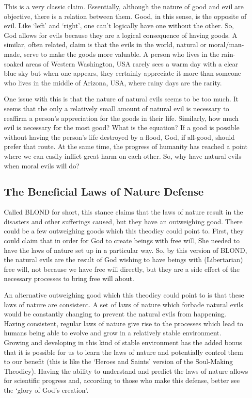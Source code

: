 This is a very classic claim. Essentially, although the nature of good and evil are objective, there is a relation between them. Good, in this sense, is the opposite of evil. Like ‘left’ and ‘right’, one can’t logically have one without the other. So, God allows for evils because they are a logical consequence of having goods. A similar, often related, claim is that the evils in the world, natural or moral/man-made, serve to make the goods more valuable. A person who lives in the rain-soaked areas of Western Washington, USA rarely sees a warm day with a clear blue sky but when one appears, they certainly appreciate it more than someone who lives in the middle of Arizona, USA, where rainy days are the rarity.  

One issue with this is that the nature of natural evils seems to be too much. It seems that the only a relatively small amount of natural evil is necessary to reaffirm a person's appreciation for the goods in their life. Similarly, how much evil is necessary for the most good? What is the equation? If a good is possible without having the person's life destroyed by a flood, God, if all-good, should prefer that route. At the same time, the progress of humanity has reached a point where we can easily inflict great harm on each other. So, why have natural evils when moral evils will do?

\subsection{The Beneficial Laws of Nature Defense}

Called BLOND for short, this stance claims that the laws of nature result in the disasters and other sufferings caused, but they have an outweighing good. There could be a few outweighing goods which this theodicy could point to. First, they could claim that in order for God to create beings with free will, She needed to have the laws of nature set up in a particular way. So, by this version of BLOND, the natural evils are the result of God wishing to have beings with (Libertarian) free will, not because we have free will directly, but they are a side effect of the necessary processes to bring free will about. 

An alternative outweighing good which  this theodicy could point to is that these laws of nature are consistent. A set of laws of nature which forbade natural evils would be constantly changing to prevent the natural evils from happening. Having consistent, regular laws of nature give rise to the processes which lead to humans being able to evolve and grow in a relatively stable environment. Growing and developing in this kind of stable environment has the added bonus that it is possible for us to learn the laws of nature and potentially control them to our benefit (this is like the `Heroes and Saints' version of the Soul-Making Theodicy). Having the ability to understand and predict the laws of nature allows for scientific progress and, according to those who make this defense, better see the `glory of God's creation'. 

